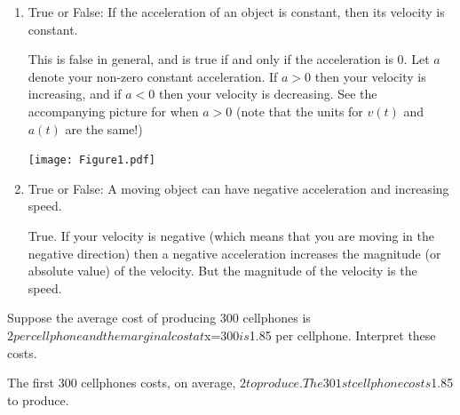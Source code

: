 \documentclass[nooutcomes,handout]{ximera}
\begin{document}
\begin{problem}	
	\begin{enumerate}
	
	\item  True or False:  If the acceleration of an object is constant, then its velocity is constant.

		\begin{freeResponse}
		This is false in general, and is true if and only if the acceleration is 0.  Let $a$ denote your non-zero constant acceleration.  If $a > 0$ then your velocity is increasing, and if $a < 0$ then your velocity is decreasing.  See the accompanying picture for when $a>0$ (note that the units for $v(t)$ and $a(t)$ are  the same!)
		
			\begin{image}
			\texttt{[image: Figure1.pdf]}
			\end{image}
		\end{freeResponse}	
		
		
	
	\item  True or False:  A moving object can have negative acceleration and increasing speed.

		\begin{freeResponse}
		True.  If your velocity is negative (which means that you are moving in the negative direction) then a negative acceleration increases the magnitude (or absolute value) of the velocity.  But the magnitude of the velocity is the speed.
		\end{freeResponse}	
		
		
		
	\end{enumerate}
	
	
\end{problem}	
	
	
\begin{problem}
Suppose the average cost of producing 300 cellphones is $2 per cellphone and the marginal cost at $x=300$ is $1.85 per cellphone.  Interpret these costs.

	\begin{freeResponse}
		The first 300 cellphones costs, on average, $2 to produce.  The 301st cellphone costs $1.85 to produce.
	\end{freeResponse}

\end{problem}
	
\end{document}
